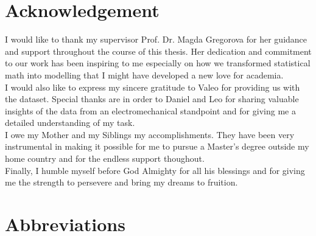 \documentclass{report} %
\begin{document}
\newpage 

\newpage 

\chapter*{Acknowledgement}
I would like to thank my supervisor Prof. Dr. Magda Gregorova for her guidance and support throughout the course of this thesis.
Her dedication and commitment to our work has been inspiring to me especially on how we transformed statistical math into modelling that I might have developed a new love for academia. \\
I would also like to express my sincere gratitude to Valeo for providing us with the dataset.
Special thanks are in order to Daniel and Leo for sharing valuable insights of the data from an electromechanical standpoint and for giving me a detailed understanding of my task. \\
I owe my Mother and my Siblings my accomplishments. They have been very instrumental in making it possible for me to pursue a Master's degree outside my home country and for the endless support thoughout.\\
Finally, I humble myself before God Almighty for all his blessings and for giving me the strength to persevere and bring my dreams to fruition.\\

\newpage

\newpage

\begin{spacing}{1.2}
    \tableofcontents
\end{spacing}

\newpage

\newpage

\chapter*{Abbreviations}
\begin{acronym}[TDMA]
  

\end{acronym}
\end{document}
